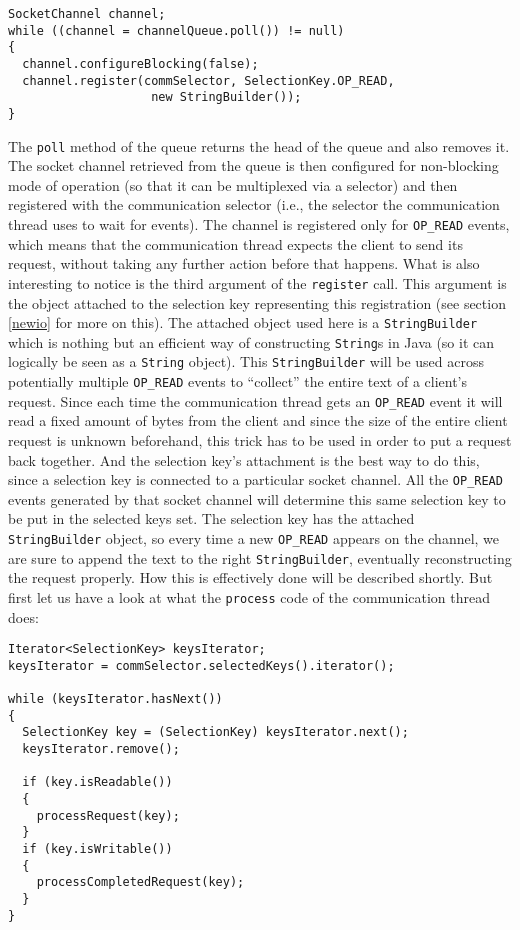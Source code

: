 \documentclass[a4paper,10pt]{article}
\begin{document}
\begin{lstlisting}
SocketChannel channel;
while ((channel = channelQueue.poll()) != null)
{
  channel.configureBlocking(false);
  channel.register(commSelector, SelectionKey.OP_READ,
                    new StringBuilder());
}
\end{lstlisting}

The \texttt{poll} method of the queue returns the head of the queue and also removes it. The socket channel retrieved
from the queue is then configured for non-blocking mode of operation (so that it can be multiplexed via a selector) and
then registered with the communication selector (i.e., the selector the communication thread uses to wait for events).
The channel is registered only for \texttt{OP\_READ} events, which means that the communication thread expects the
client to send its request, without taking any further action before that happens.
What is also interesting to notice is the third argument of the \texttt{register} call. This argument
is the object attached to the selection key representing this registration (see section \ref{newio} for more on this).
The attached object used here is a \texttt{StringBuilder} which is nothing but an efficient way of constructing \texttt{String}s
in Java (so it can logically be seen as a \texttt{String} object). This \texttt{StringBuilder} will be used across potentially
multiple \texttt{OP\_READ} events to ``collect'' the entire text of a client's request. Since each time the communication
thread gets an \texttt{OP\_READ} event it will read a fixed amount of bytes from the client and since the size of the entire
client request is unknown beforehand, this trick has to be used in order to put a request back together. And the selection
key's attachment is the best way to do this, since a selection key is connected to a particular socket channel. All the
\texttt{OP\_READ} events generated by that socket channel will determine this same selection key to be put in the selected
keys set. The selection key has the attached \texttt{StringBuilder} object, so every time a new \texttt{OP\_READ} appears
on the channel, we are sure to append the text to the right \texttt{StringBuilder}, eventually reconstructing the request properly.
How this is effectively done will be described shortly. But first let us have a look at what the \texttt{process} code of the
communication thread does:

\begin{lstlisting}
Iterator<SelectionKey> keysIterator;
keysIterator = commSelector.selectedKeys().iterator();

while (keysIterator.hasNext())
{
  SelectionKey key = (SelectionKey) keysIterator.next();
  keysIterator.remove();

  if (key.isReadable())
  {
    processRequest(key);
  }
  if (key.isWritable())
  {
    processCompletedRequest(key);
  }
}
\end{lstlisting}
\end{document}
